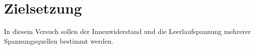 \setcounter{page}{1}
\section{Zielsetzung}
\label{sec:Zielsetzung}

In diesem Versuch sollen der Innenwiderstand und die Leerlaufspannung mehrerer Spannungsquellen bestimmt werden.
